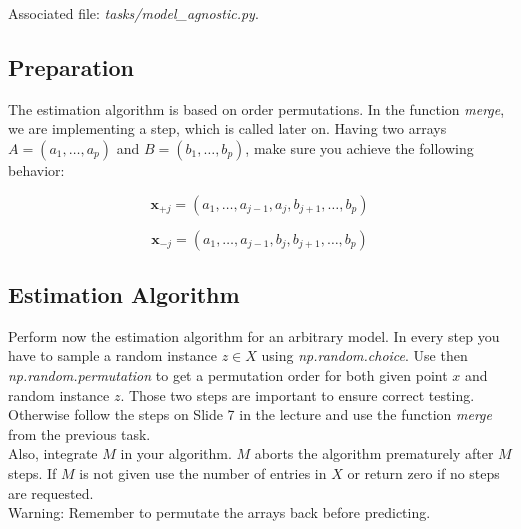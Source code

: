 \documentclass[a4paper]{article}
\begin{document}
\noindent Associated file: \textit{tasks/model\_agnostic.py}.

\subsection{Preparation}

The estimation algorithm is based on order permutations. In the function \textit{merge}, we are implementing a step, which is called later on. Having two arrays $A = (a_1, \ldots, a_p)$ and $B = (b_1, \ldots, b_p)$, make sure you achieve the following behavior:

\begin{equation}
    \mathbf{x}_{+j} = (a_1, \ldots, a_{j-1}, a_j, b_{j+1}, \ldots, b_{p})
\end{equation}

\begin{equation}
    \mathbf{x}_{-j} = (a_1, \ldots, a_{j-1}, b_j, b_{j+1}, \ldots, b_{p})
\end{equation}


\subsection{Estimation Algorithm}

Perform now the estimation algorithm for an arbitrary model. In every step you have to sample a random instance $z \in X$ using \textit{np.random.choice}. Use then \textit{np.random.permutation} to get a permutation order for both given point $x$ and random instance $z$. Those two steps are important to ensure correct testing. Otherwise follow the steps on Slide 7 in the lecture and use the function \textit{merge} from the previous task.\\

\noindent Also, integrate $M$ in your algorithm. $M$ aborts the algorithm prematurely after $M$ steps. If $M$ is not given use the number of entries in $X$ or return zero if no steps are requested.\\

\noindent Warning: Remember to permutate the arrays back before predicting.
\end{document}

